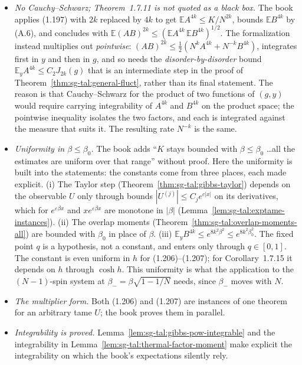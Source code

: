 \begin{remark}
\label{rem:sg-tal:dev-1713}
\begin{itemize}
\item \emph{No Cauchy--Schwarz; Theorem~1.7.11 is not quoted as a black box.}  The book applies (1.197) with $2k$ replaced by $4k$ to get $\mathbb EA^{4k}\le K/N^{2k}$, bounds $\mathbb EB^{4k}$ by (A.6), and concludes with
  $\mathbb E(AB)^{2k}\le(\mathbb EA^{4k}\,\mathbb EB^{4k})^{1/2}$.  The formalization instead multiplies out \emph{pointwise}: $(AB)^{2k}\le\frac12(N^kA^{4k}+N^{-k}B^{4k})$, integrates first in $y$ and then in $g$, and so needs the
  \emph{disorder-by-disorder} bound $\mathbb E_yA^{4k}\le C_2J_{2k}(g)$ that is an intermediate step in the proof of Theorem~\ref{thm:sg-tal:general-fluct}, rather than its final statement.  The reason is that Cauchy--Schwarz for the product of two functions of $(g,y)$ would
  require carrying integrability of $A^{4k}$ and $B^{4k}$ on the product space; the pointwise inequality isolates the two factors, and each is integrated against the measure that suits it.  The resulting rate $N^{-k}$ is the same.
\item \emph{Uniformity in $\beta\le\beta_0$.}  The book adds ``$K$ stays bounded with $\beta\le\beta_0$ \dots all the estimates are uniform over that range'' without proof.  Here the uniformity is built into the statements: the constants come from three places, each made explicit.  (i) The Taylor step (Theorem~\ref{thm:sg-tal:gibbs-taylor}) depends on the observable $U$ only through bounds $|U^{(j)}|\le C_je^{c|x|}$ on its derivatives, which for $e^{\varepsilon\beta x}$ and $xe^{\varepsilon\beta x}$ are monotone in $|\beta|$ (Lemma~\ref{lem:sg-tal:exptame-instances}).  (ii) The overlap moments (Theorem~\ref{thm:sg-tal:overlap-moments-all}) are bounded with $\beta_0$ in place of $\beta$.  (iii) $\mathbb E_yB^{4k}\le e^{8k^2\beta^2}\le e^{8k^2\beta_0^2}$.  The fixed point $q$ is a hypothesis, not a constant, and enters only through $q\in[0,1]$.  The constant is even uniform in $h$ for (1.206)--(1.207); for Corollary~1.7.15 it depends on $h$ through $\cosh h$.  This uniformity is what the application to the $(N-1)$-spin system at $\beta_-=\beta\sqrt{1-1/N}$ needs, since $\beta_-$ moves with $N$.
\item \emph{The multiplier form.}  Both (1.206) and (1.207) are instances of one theorem for an arbitrary tame $U$; the book proves them in parallel.
\item \emph{Integrability is proved.}  Lemma~\ref{lem:sg-tal:gibbs-pow-integrable} and the integrability in Lemma~\ref{lem:sg-tal:thermal-factor-moment} make explicit the integrability on which the book's expectations silently rely.
\end{itemize}
\end{remark}

